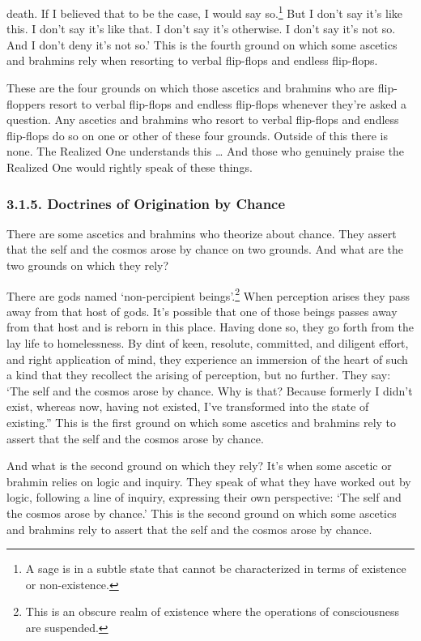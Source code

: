 \documentclass[12pt,openany]{book}%
\begin{document}
death. If I believed that to be the case, I would say so.\footnote{A sage is in a subtle state that cannot be characterized in terms of existence or non-existence. } But I don’t say it’s like this. I don’t say it’s like that. I don’t say it’s otherwise. I don’t say it’s not so. And I don’t deny it’s not so.’ This is the fourth ground on which some ascetics and brahmins rely when resorting to verbal flip-flops and endless flip-flops. 

These are the four grounds on which those ascetics and brahmins who are flip-floppers resort to verbal flip-flops and endless flip-flops whenever they’re asked a question. Any ascetics and brahmins who resort to verbal flip-flops and endless flip-flops do so on one or other of these four grounds. Outside of this there is none. The Realized One understands this … And those who genuinely praise the Realized One would rightly speak of these things. 

\subsubsection*{3.1.5. Doctrines of Origination by Chance }

There are some ascetics and brahmins who theorize about chance. They assert that the self and the cosmos arose by chance on two grounds. And what are the two grounds on which they rely? 

There are gods named ‘non-percipient beings’.\footnote{This is an obscure realm of existence where the operations of consciousness are suspended. } When perception arises they pass away from that host of gods. It’s possible that one of those beings passes away from that host and is reborn in this place. Having done so, they go forth from the lay life to homelessness. By dint of keen, resolute, committed, and diligent effort, and right application of mind, they experience an immersion of the heart of such a kind that they recollect the arising of perception, but no further. They say: ‘The self and the cosmos arose by chance. Why is that? Because formerly I didn’t exist, whereas now, having not existed, I’ve transformed into the state of existing.” This is the first ground on which some ascetics and brahmins rely to assert that the self and the cosmos arose by chance. 

And what is the second ground on which they rely? It’s when some ascetic or brahmin relies on logic and inquiry. They speak of what they have worked out by logic, following a line of inquiry, expressing their own perspective: ‘The self and the cosmos arose by chance.’ This is the second ground on which some ascetics and brahmins rely to assert that the self and the cosmos arose by chance. 
\end{document}
